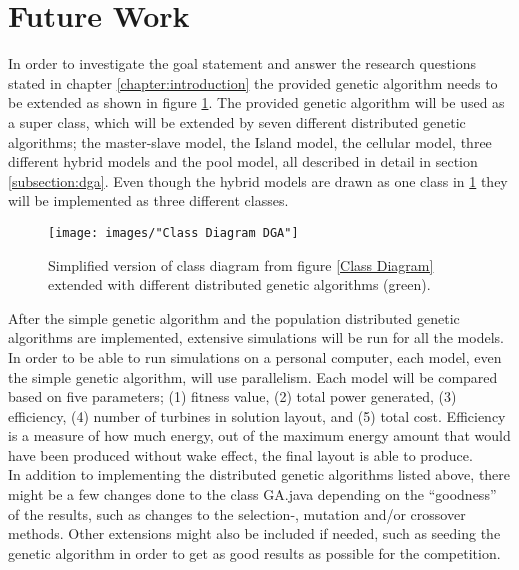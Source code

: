 \section{Future Work}\label{section:futurework}
In order to investigate the goal statement and answer the research questions stated in chapter \ref{chapter:introduction} the provided genetic algorithm needs to be extended as shown in figure \ref{Class Diagram DGA}. The provided genetic algorithm will be used as a super class, which will be extended by seven different distributed genetic algorithms; the master-slave model, the Island model, the cellular model, three different hybrid models and the pool model, all described in detail in section \ref{subsection:dga}. Even though the hybrid models are drawn as one class in \ref{Class Diagram DGA} they will be implemented as three different classes. \\

\begin{figure}[h!]
\begin{center}
\texttt{[image: images/"Class Diagram DGA"]}
\caption{Simplified version of class diagram from figure \ref{Class Diagram} extended with different distributed genetic algorithms (green).}
\label{Class Diagram DGA}
\end{center}
\end{figure}

\noindent After the simple genetic algorithm and the population distributed genetic algorithms are implemented, extensive simulations will be run for all the models. In order to be able to run simulations on a personal computer, each model, even the simple genetic algorithm, will use parallelism. Each model will be compared based on five parameters; (1) fitness value, (2) total power generated, (3) efficiency, (4) number of turbines in solution layout, and (5) total cost. Efficiency is a measure of how much energy, out of the maximum energy amount that would have been produced without wake effect, the final layout is able to produce. \\

\noindent In addition to implementing the distributed genetic algorithms listed above, there might be a few changes done to the class GA.java depending on the ``goodness'' of the results, such as changes to the selection-, mutation and/or crossover methods. Other extensions might also be included if needed, such as seeding the genetic algorithm in order to get as good results as possible for the competition.\\

